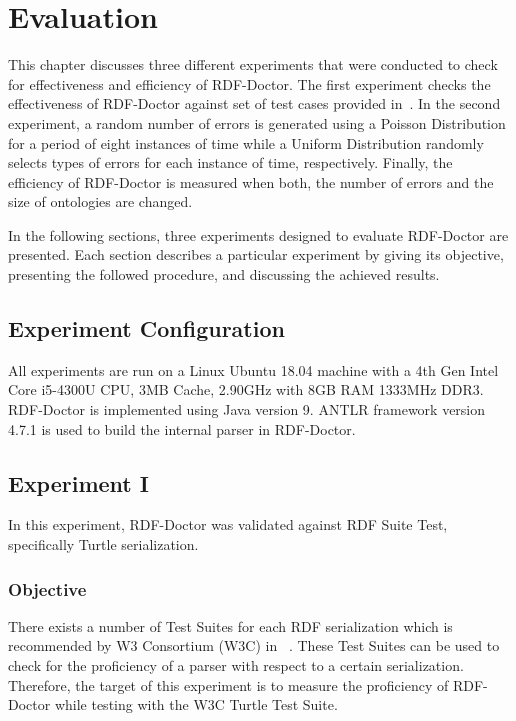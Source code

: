 \chapter{Evaluation}
\label{ch:evaluation}

This chapter discusses three different experiments that were conducted to check for effectiveness and efficiency of RDF-Doctor.
The first experiment checks the effectiveness of RDF-Doctor against set of test cases provided in~\cite{TurtleTests:Online}.
In the second experiment, a random number of errors is generated using a Poisson Distribution for a period of eight instances of time while a Uniform Distribution randomly selects types of errors for each instance of time, respectively.
Finally, the efficiency of RDF-Doctor is measured when both, the number of errors and the size of ontologies are changed. 

In the following sections, three experiments designed to evaluate RDF-Doctor are presented. 
Each section describes a particular experiment by giving its objective, presenting the followed procedure, and discussing the achieved results.

\section{Experiment Configuration}

All experiments are run on a Linux Ubuntu 18.04 machine with a 4th Gen Intel Core i5-4300U CPU, 3MB Cache, 2.90GHz with 8GB RAM 1333MHz DDR3. 
RDF-Doctor is implemented using Java version 9. 
ANTLR framework version 4.7.1 is used to build the internal parser in RDF-Doctor.%

\section{Experiment I} 
In this experiment, RDF-Doctor was validated against RDF Suite Test, specifically Turtle serialization. 

\subsection{Objective}

There exists a number of Test Suites for each RDF serialization which is recommended by W3 Consortium (W3C) in ~\cite{TurtleTests:Online}.
These Test Suites can be used to check for the proficiency of a parser with respect to a certain serialization.%
Therefore, the target of this experiment is to measure the proficiency of RDF-Doctor while testing with the W3C Turtle Test Suite.

